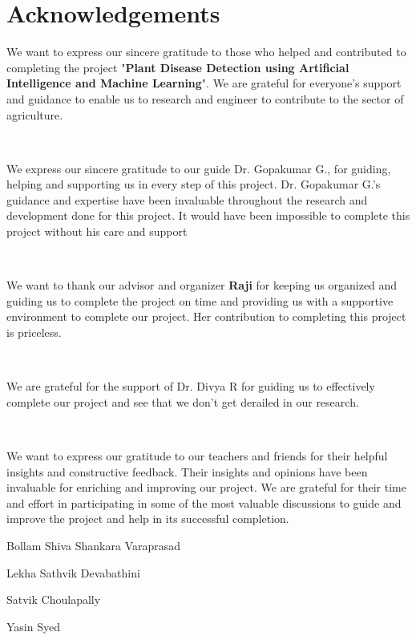 \documentclass[a4paper, 12pt]{report}
\theoremstyle{definition}
\begin{document}
\newpage
	\clearpage
	\tableofcontents
	
	\chapter*{Acknowledgements}

    
	We want to express our sincere gratitude to those who helped and contributed to completing the project "\textbf{Plant Disease Detection using Artificial Intelligence and Machine Learning}". We are grateful for everyone's support and guidance to enable us to research and engineer to contribute to the sector of agriculture. 
	
	\

    We express our sincere gratitude to our guide Dr. Gopakumar G., for guiding, helping and supporting us in every step of this project. Dr. Gopakumar G.'s guidance and expertise have been invaluable throughout the research and development done for this project. It would have been impossible to complete this project without his care and support 

	\
	
    We want to thank our advisor and organizer \textbf{Raji} for keeping us organized and guiding us to complete the project on time and providing us with a supportive environment to complete our project. Her contribution to completing this project is priceless.

	\
	
    We are grateful for the support of Dr. Divya R for guiding us to effectively complete our project and see that we don't get derailed in our research.

	\
	
    We want to express our gratitude to our teachers and friends for their helpful insights and constructive feedback. Their insights and opinions have been invaluable for enriching and improving our project. We are grateful for their time and effort in participating in some of the most valuable discussions to guide and improve the project and help in its successful completion.
    

    
	\vspace{1cm}
	\begin{flushright}
        Bollam Shiva Shankara Varaprasad
        
		Lekha Sathvik Devabathini
        
        Satvik Choulapally
        
        Yasin Syed
	\end{flushright}
	\listoffigures
	\listoftables
	\newpage
\end{document}

